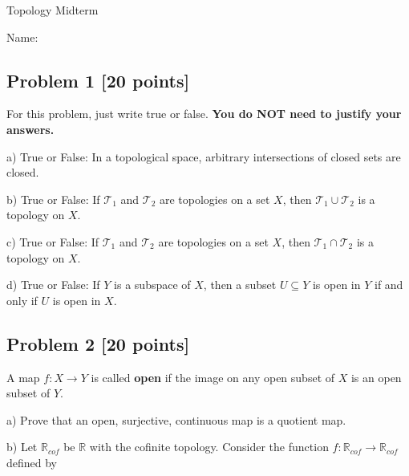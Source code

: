 \documentclass{article}
\newcommand{\bigjump}{\vspace{1.7 in}}
\begin{document}
\begin{center}
   {\huge Topology Midterm}
\end{center}

\vspace{0.3 in}

Name: \underline{\hspace{6cm}}

\vspace{0.2cm}


\subsection*{Problem 1 [20 points]}
For this problem, just write true or false. \textbf{You do NOT need to justify your answers.}

\vspace{0.5cm}

a) True or False: In a topological space, arbitrary intersections of closed sets are closed.

\bigjump

b) True or False: If $\mathcal{T}_1$ and $\mathcal{T}_2$ are topologies on a set $X$, then $\mathcal{T}_1 \cup \mathcal{T}_2$ is a topology on $X$.

\bigjump

c) True or False: If $\mathcal{T}_1$ and $\mathcal{T}_2$ are topologies on a set $X$, then $\mathcal{T}_1 \cap \mathcal{T}_2$ is a topology on $X$.

\bigjump

d) True or False: If $Y$ is a subspace of $X$, then a subset $U \subseteq Y$ is open in $Y$ if and only if $U$ is open in $X$.

\newpage

\subsection*{Problem 2 [20 points]}

A map $f: X \rightarrow Y$ is called \textbf{open} if the image on any open subset of $X$ is an open subset of $Y$.

\vspace{0.5cm}

a) Prove that an open, surjective, continuous map is a quotient map.

\vspace{8cm}

b) Let $\mathbb{R}_{cof}$ be $\mathbb{R}$ with the cofinite topology. Consider the function $f: \mathbb{R}_{cof} \rightarrow \mathbb{R}_{cof}$ defined by
\end{document}
